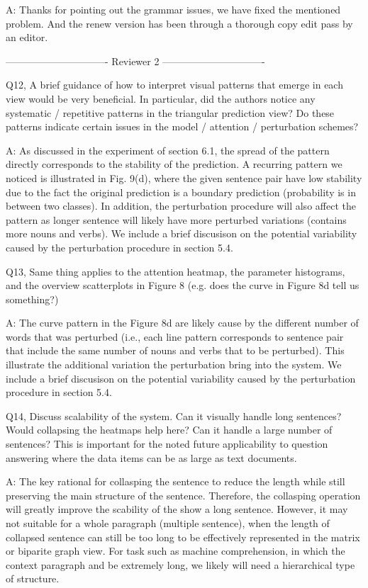 A: Thanks for pointing out the grammar issues, we have fixed the mentioned problem. And the renew version has been through a thorough copy edit pass by an editor.

------------------------------- Reviewer 2 -------------------------------

Q12, A brief guidance of how to interpret visual patterns that emerge in each view would be very beneficial. In particular, did the authors notice any systematic / repetitive patterns in the triangular prediction view? Do these patterns indicate certain issues in the model / attention / perturbation schemes?

A: As discussed in the experiment of section 6.1, the spread of the pattern directly corresponds to the stability of the prediction. A recurring pattern we noticed is illustrated in Fig. 9(d), where the given sentence pair have low stability due to the fact the original prediction is a boundary prediction (probability is in between two classes). In addition, the perturbation procedure will also affect the pattern as longer sentence will likely have more perturbed variations (contains more nouns and verbs). We include a brief discusison on the potential variability caused by the perturbation procedure in section 5.4.

Q13, Same thing applies to the attention heatmap, the parameter histograms, and the overview scatterplots in Figure 8 (e.g. does the curve in Figure 8d tell us something?)

A: The curve pattern in the Figure 8d are likely cause by the different number of words that was perturbed (i.e., each line pattern corresponds to sentence pair that include the same number of nouns and verbs that to be perturbed). This illustrate the additional variation the perturbation bring into the system. We include a brief discusison on the potential variability caused by the perturbation procedure in section 5.4.

Q14, Discuss scalability of the system. Can it visually handle long sentences? Would collapsing the heatmaps help here? Can it handle a large number of sentences? This is important for the noted future applicability to question answering where the data items can be as large as text documents.

A: The key rational for collasping the sentence to reduce the length while still preserving the main structure of the sentence. Therefore, the collasping operation will greatly improve the scability of the show a long sentence. However, it may not suitable for a whole paragraph (multiple sentence), when the length of collapsed sentence can still be too long to be effectively represented in the matrix or biparite graph view. For task such as machine comprehension, in which the context paragraph and be extremely long, we likely will need a hierarchical type of structure.

